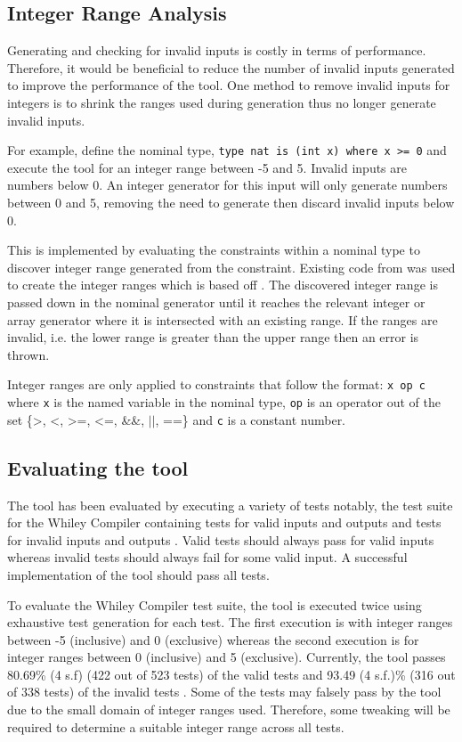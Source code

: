 \subsection{Integer Range Analysis}

Generating and checking for invalid inputs is costly in terms of performance. 
Therefore, it would be beneficial to reduce the number of invalid inputs generated to improve the performance of the tool.
One method to remove invalid inputs for integers is to shrink the ranges used during generation thus no longer generate invalid inputs.

For example, define the nominal type, \texttt{type nat is (int x) where x \textgreater= 0} and execute the tool for an integer range between -5 and 5. Invalid inputs are numbers below 0. An integer generator for this input will only generate numbers between 0 and 5, removing the need to generate then discard invalid inputs below 0.

This is implemented by evaluating the constraints within a nominal type to discover integer range generated from the constraint.
Existing code from \cite{whileyIntegerRangeCode} was used to create the integer ranges which is based off \cite{whileyIntegerRange}.
The discovered integer range is passed down in the nominal generator until it reaches the relevant integer or array generator where it is intersected with an existing range.
If the ranges are invalid, i.e. the lower range is greater than the upper range then an error is thrown.

Integer ranges are only applied to constraints that follow the format: \texttt{x op c} where \texttt{x} is the named variable in the nominal type, \texttt{op} is an operator out of the set \{\textgreater, \textless, \textgreater=, \textless=, \&\&, $||$, ==\} and \texttt{c} is a constant number.

\subsection{Evaluating the tool}
\label{subsec:toolEval}
The tool has been evaluated by executing a variety of tests notably, the test suite for the Whiley Compiler containing tests for valid inputs and outputs and tests for invalid inputs and outputs \cite{whileyCompilerTests}. 
Valid tests should always pass for valid inputs whereas invalid tests should always fail for some valid input. 
A successful implementation of the tool should pass all tests.

To evaluate the Whiley Compiler test suite, the tool is executed twice using exhaustive test generation for each test. The first execution is with integer ranges between -5 (inclusive) and 0  (exclusive) whereas the second execution is for integer ranges between 0 (inclusive) and 5 (exclusive).
Currently, the tool passes 80.69\% (4 s.f) (422 out of 523 tests) of the valid tests and 93.49 (4 s.f.)\% (316 out of 338 tests) of the invalid tests \cite{qcWhileyStatistics}. Some of the tests may falsely pass by the tool due to the small domain of integer ranges used. Therefore, some tweaking will be required to determine a suitable integer range across all tests.

